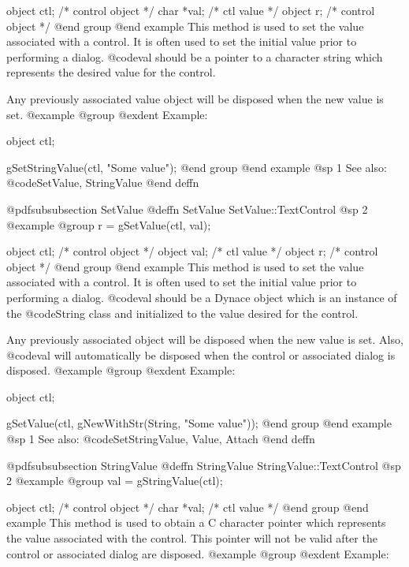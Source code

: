 object  ctl;    /*  control object  */
char    *val;   /*  ctl value       */
object  r;      /*  control object  */
@end group
@end example
This method is used to set the value associated with a control.  It is
often used to set the initial value prior to performing a dialog.
@code{val} should be a pointer to a character string which represents
the desired value for the control.

Any previously associated value object will be disposed when the new
value is set.  
@example
@group
@exdent Example:

object  ctl;

gSetStringValue(ctl, "Some value");
@end group
@end example
@sp 1
See also:  @code{SetValue, StringValue}
@end deffn








@pdfsubsubsection {SetValue}
@deffn {SetValue} SetValue::TextControl
@sp 2
@example
@group
r = gSetValue(ctl, val);

object  ctl;    /*  control object  */
object  val;    /*  ctl value       */
object  r;      /*  control object  */
@end group
@end example
This method is used to set the value associated with a control.  It is
often used to set the initial value prior to performing a dialog.
@code{val} should be a Dynace object which is an instance of the
@code{String} class and initialized to the value desired for the control.

Any previously associated object will be disposed when the new value is set.
Also, @code{val} will automatically be disposed when the control or associated
dialog is disposed.
@example
@group
@exdent Example:

object  ctl;

gSetValue(ctl, gNewWithStr(String, "Some value"));
@end group
@end example
@sp 1
See also:  @code{SetStringValue, Value, Attach}
@end deffn









@pdfsubsubsection {StringValue}
@deffn {StringValue} StringValue::TextControl
@sp 2
@example
@group
val = gStringValue(ctl);

object  ctl;   /*  control object  */
char    *val;  /*  ctl value       */
@end group
@end example
This method is used to obtain a C character pointer which represents the
value associated with the control.  This pointer will not be valid
after the control or associated dialog are disposed.
@example
@group
@exdent Example:

